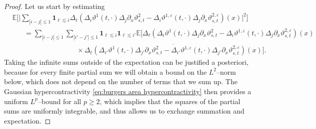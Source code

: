 \documentclass[a4paper,11pt]{article}
\theoremstyle{remark}
\newcommand{\E}{\mathbb{E}}
\begin{document}
\begin{proof}
   Let us start by estimating
   \begin{align}\label{e:burgers area pr1}
      &\E\biggl[\biggl| \sum_{|i-j| \leqslant 1} \mathbf{1}_{\ell \lesssim i} \Delta_{\ell} ( \Delta_i \vartheta^1(t,\cdot) \Delta_j \partial_x \vartheta^2_{s,t} - \Delta_i \vartheta^{1,\varepsilon} (t,\cdot) \Delta_j \partial_x \vartheta^{2,\varepsilon}_{s,t})(x)\biggr|^2\biggr] \\ \nonumber
      &\hspace{20pt} = \sum_{| i - j | \leqslant 1} \sum_{| i' - j' | \leqslant 1} \mathbf{1}_{\ell \lesssim i} \mathbf{1}_{\ell \lesssim i'} \E\bigg[\Delta_{\ell} (\Delta_i \vartheta^1(t,\cdot) \Delta_j \partial_x \vartheta^2_{s,t} - \Delta_i \vartheta^{1,\varepsilon} (t,\cdot) \Delta_j \partial_x \vartheta^{2,\varepsilon}_{s,t})(x)\\ \nonumber
      &\hspace{110pt} \times \overline{\Delta_{\ell} ( \Delta_{i'} \vartheta^1(t,\cdot) \Delta_{j'} \partial_x \vartheta^2_{s,t} - \Delta_{i'} \vartheta^{1,\varepsilon} (t,\cdot) \Delta_{j'} \partial_x \vartheta^{2,\varepsilon}_{s,t})(x)}\bigg].
   \end{align}
   Taking the infinite sums outside of the expectation can be justified a posteriori, because for every finite partial sum we will obtain a bound on the $L^2$--norm below, which does not depend on the number of terms that we sum up. The Gaussian hypercontractivity \eqref{eq:burgers area hypercontractivity} then provides a uniform $L^p$--bound for all $p \geqslant 2$, which implies that the squares of the partial sums are uniformly integrable, and thus allows us to exchange summation and expectation.
   

\end{proof}
\end{document}
